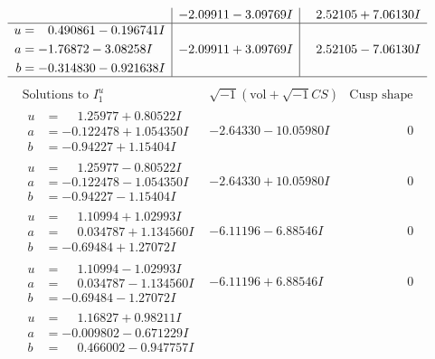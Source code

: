 \documentclass[1p]{elsarticle_modified}
\theoremstyle{definition}
\newcommand{\I}{\sqrt{-1}}
\begin{document}
$$\begin{array}{c|c|c}
 & -2.09911 - 3.09769 I & \phantom{-}2.52105 + 7.06130 I \\ \hline\begin{aligned}
u &= \phantom{-}0.490861 - 0.196741 I \\
a &= -1.76872 - 3.08258 I \\
b &= -0.314830 - 0.921638 I\end{aligned}
 & -2.09911 + 3.09769 I & \phantom{-}2.52105 - 7.06130 I\\
 \hline 
 \end{array}$$\newpage$$\begin{array}{c|c|c}  
\text{Solutions to }I^u_{1}& \I (\text{vol} + \sqrt{-1}CS) & \text{Cusp shape}\\
 \hline 
\begin{aligned}
u &= \phantom{-}1.25977 + 0.80522 I \\
a &= -0.122478 + 1.054350 I \\
b &= -0.94227 + 1.15404 I\end{aligned}
 & -2.64330 - 10.05980 I & \phantom{-0.000000 } 0 \\ \hline\begin{aligned}
u &= \phantom{-}1.25977 - 0.80522 I \\
a &= -0.122478 - 1.054350 I \\
b &= -0.94227 - 1.15404 I\end{aligned}
 & -2.64330 + 10.05980 I & \phantom{-0.000000 } 0 \\ \hline\begin{aligned}
u &= \phantom{-}1.10994 + 1.02993 I \\
a &= \phantom{-}0.034787 + 1.134560 I \\
b &= -0.69484 + 1.27072 I\end{aligned}
 & -6.11196 - 6.88546 I & \phantom{-0.000000 } 0 \\ \hline\begin{aligned}
u &= \phantom{-}1.10994 - 1.02993 I \\
a &= \phantom{-}0.034787 - 1.134560 I \\
b &= -0.69484 - 1.27072 I\end{aligned}
 & -6.11196 + 6.88546 I & \phantom{-0.000000 } 0 \\ \hline\begin{aligned}
u &= \phantom{-}1.16827 + 0.98211 I \\
a &= -0.009802 - 0.671229 I \\
b &= \phantom{-}0.466002 - 0.947757 I\end{aligned}

\end{array}$$
\end{document}
